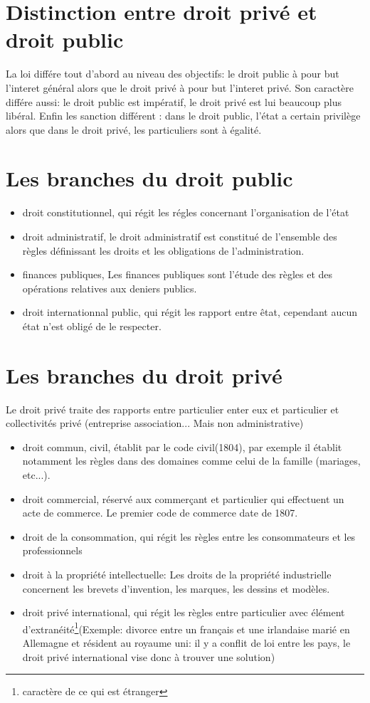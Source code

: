 \documentclass[a4paper]{article}
\begin{document}
		\section{Distinction entre droit privé et droit public }
			La loi différe tout d'abord au niveau des objectifs: le droit public à pour but l'interet général alors que le droit privé à pour but l'interet privé. Son caractère différe aussi: le droit public est impératif, le droit privé est lui beaucoup plus libéral. Enfin les sanction différent : dans le droit public, l'état a certain privilège alors que dans le droit privé, les particuliers sont à égalité. 
		\section{Les branches du droit public} 
			\begin{itemize}
				\item droit constitutionnel, qui régit les régles concernant l'organisation de l'état
				\item droit administratif, le droit administratif est constitué de l'ensemble des règles définissant les droits et les obligations de l'administration.
				\item finances publiques, Les finances publiques sont l'étude des règles et des opérations relatives aux deniers publics. 
				\item droit internationnal public, qui régit les rapport entre êtat, cependant aucun état n'est obligé de le respecter. 
			\end{itemize}
		\section{Les branches du droit privé}
			Le droit privé traite des rapports entre particulier enter eux et particulier et collectivités privé (entreprise association... Mais non administrative)
			\begin{itemize}
				\item droit commun, civil, établit par le code civil(1804), par exemple il établit notamment les règles dans des domaines comme celui de la famille (mariages, etc...).
				\item droit commercial, réservé aux commerçant et particulier qui effectuent un acte de commerce. Le premier code de commerce date de 1807.
				\item droit de la consommation, qui régit les règles entre les consommateurs et les professionnels
				\item droit à la propriété intellectuelle: Les droits de la propriété industrielle concernent les brevets d'invention, les marques, les dessins et modèles. 
				\item droit privé international, qui régit les règles entre particulier avec élément d'extranéité\footnote{caractère de ce qui est étranger}(Exemple: divorce entre un français et une irlandaise marié en Allemagne et résident au royaume uni: il y a conflit de loi entre les pays, le droit privé international vise donc à trouver une solution)
			\end{itemize}
\end{document}
